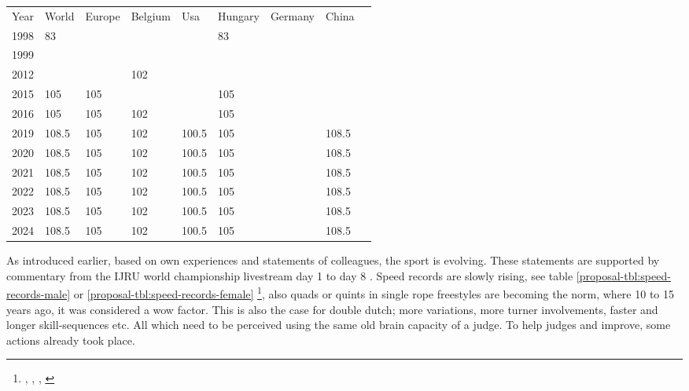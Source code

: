 \begin{table*}[]
    \begin{tabular}{lllllllll}
        Year & World & Europe & Belgium & Usa   & Hungary & Germany & China \\
        1998 & 83    &        &         &       & 83      &         &       \\
        1999 &       &        &         &       &         &         &       \\
        2012 &       &        & 102     &       &         &         &       \\
        2015 & 105   & 105    &         &       & 105     &         &       \\
        2016 & 105   & 105    & 102     &       & 105     &         &       \\
        2019 & 108.5 & 105    & 102     & 100.5 & 105     &         & 108.5 \\
        2020 & 108.5 & 105    & 102     & 100.5 & 105     &         & 108.5 \\
        2021 & 108.5 & 105    & 102     & 100.5 & 105     &         & 108.5 \\
        2022 & 108.5 & 105    & 102     & 100.5 & 105     &         & 108.5 \\
        2023 & 108.5 & 105    & 102     & 100.5 & 105     &         & 108.5 \\
        2024 & 108.5 & 105    & 102     & 100.5 & 105     &         & 108.5
    \end{tabular}
    \caption{History of speed records females}
    \label{proposal-tbl:speed-records-female}
\end{table*}

As introduced earlier, based on own experiences and statements of colleagues, the sport is evolving. These statements are supported by commentary from the IJRU world championship livestream day 1 \autocite{IJRU_yt_2023_livestream_day1} to day 8 \autocite{IJRU_yt_2023_livestream_day8}.
Speed records are slowly rising, see table \ref{proposal-tbl:speed-records-male} or \ref{proposal-tbl:speed-records-female} \footnote{\autocite{www_speed_30s_1999_WORLD}, \autocite{www_speed_30s_2024_BE}, \autocite{www_speed_30s_2024_IJRU_WORLD}, \autocite{www_speed_30s_2024_USA_AMJRF}}, also quads or quints in single rope freestyles are becoming the norm, where 10 to 15 years ago, it was considered a wow factor. This is also the case for double dutch; more variations, more turner involvements, faster and longer skill-sequences etc.
All which need to be perceived using the same old brain capacity of a judge.
To help judges and improve, some actions already took place.

